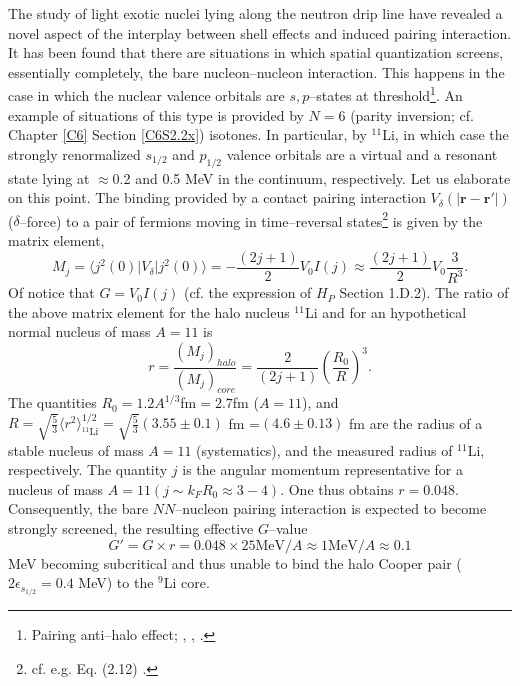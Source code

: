 The study of light exotic nuclei lying along the neutron drip line have revealed a novel aspect of the interplay between shell effects and induced pairing interaction. It has been found  that there are situations in which spatial quantization screens, essentially completely, the bare nucleon--nucleon interaction. This happens in the case in which the nuclear valence orbitals are $s,p$--states at threshold\footnote{Pairing anti--halo effect; \cite{Bennaceur:00} 
, \cite{Hamamoto:03}, \cite{Hamamoto:04}.}. An example of situations of this type is provided by $N=6$ (parity inversion; cf. Chapter \ref{C6} Section \ref{C6S2.2x}) isotones. In particular, by $^{11}$Li, in which case the strongly renormalized $s_{1/2}$ and $p_{1/2}$ valence orbitals are a virtual and a resonant state lying at $\approx$0.2 and 0.5 MeV in the continuum, respectively. Let us elaborate on this point. 
The binding provided by a contact pairing interaction $V_\delta (|\mathbf{r}-\mathbf{r}'|)$ ($\delta$--force) to a pair of fermions moving in time--reversal states\footnote{cf. e.g. Eq. (2.12) \cite{Brink:05}.} is given by the matrix element,
\begin{equation*}
M_j=\langle j^2(0)|V_\delta|j^2(0)\rangle=-\frac{(2j+1)}{2} V_0 I(j)\approx \frac{(2j+1)}{2}V_0\frac{3}{R^3}.
\end{equation*} 
Of notice that $G=V_0I(j)$ (cf. the expression of $H_P$ Section 1.D.2). 
The ratio of the above matrix element for the halo nucleus $^{11}$Li and for an hypothetical normal nucleus of mass $A=11$ is
\begin{equation*}
r=\frac{(M_j)_{halo}}{(M_j)_{core}}=\frac{2}{(2j+1)}\left(\frac{R_0}{R}\right)^3.
\end{equation*}
The quantities $R_0=1.2 A^{1/3}$fm$=2.7$fm ($A=11$), and $R=\sqrt{\frac{5}{3}}\langle r^2\rangle^{1/2}_{^{11}\text{Li}}=\sqrt{\frac{5}{3}}(3.55\pm0.1)$ fm =$(4.6\pm 0.13)$ fm are the radius of a stable nucleus of mass $A=11$ (systematics), and  the measured radius of $^{11}$Li, respectively. The quantity $j$ is the angular momentum representative for a nucleus of mass $A=11 (j\sim k_F R_0\approx 3-4)$. One thus obtains $r=0.048$. Consequently, the bare $NN$--nucleon pairing interaction is expected to become strongly screened, the resulting effective $G$--value 
\begin{equation}\label{eq1C2AppF}
G'=G\times r=0.048\times 25 \text{MeV}/A\approx 1 \text{MeV}/A\approx 0.1
\end{equation}
MeV becoming subcritical and thus unable to bind the halo Cooper pair ($2\epsilon_{s_{1/2}}=0.4$ MeV) to the $^9$Li core.



